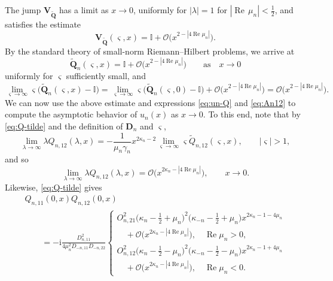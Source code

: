 \documentclass[pdftex]{sigma}
\numberwithin{equation}{section}
\newcommand{\ii}{\mathrm{i}}
\newcommand{\re}{\operatorname{Re}}
\begin{document}
The jump $\mathbf{V}_{\widetilde{\mathbf{Q}}}$ has a limit as $x\to 0$, uniformly for $|\lambda|=1$ for $|{\re}\,  \mu_n| <\frac{1}{2}$, and satisfies the estimate
\begin{equation*}
 \mathbf{V}_{\widetilde{\mathbf{Q}}}(\varsigma,x)=\mathbb{I}+\mathcal{O} \big(x^{2-|4\re\mu_n|} \big).
\end{equation*}
By the standard theory of small-norm Riemann--Hilbert problems, we arrive at
\begin{equation*}
 \widetilde{\mathbf{Q}}_n(\varsigma,x)=\mathbb{I} + \mathcal{O} \big(x^{2-|4\re\mu_n|} \big) \qquad \text{as} \quad x\to 0
\end{equation*}
uniformly for $\varsigma$ sufficiently small, and
\begin{equation*}
 \lim_{\varsigma\to\infty}\varsigma\big(\widetilde{\mathbf{Q}}_n(\varsigma,x)-\mathbb{I}\big)=\lim_{\varsigma\to\infty}\varsigma\big(\widetilde{\mathbf{Q}}_n(\varsigma,0)-\mathbb{I}\big)+\mathcal{O}\big(x^{2-|4\re\mu_n|} \big)=\mathcal{O}\big(x^{2-|4\re\mu_n|} \big).
\end{equation*}
We can now use the above estimate and expressions \eqref{eq:un-Q} and \eqref{eq:An12} to compute the asymptotic behavior of $u_n(x)$ as $x\to 0$. To this end, note that by \eqref{eq:Q-tilde} and the definition of $\mathbf{D}_n$ and $\varsigma$,
\begin{equation*}
 \lim_{\lambda\to\infty}\lambda Q_{n,12}(\lambda,x)=-\frac{1}{\mu_n\gamma_n} x^{2\kappa_n-2} \lim_{\varsigma\to\infty}\varsigma \widetilde{Q}_{n,12}(\varsigma,x),\qquad |\varsigma|>1,
\end{equation*}
and so
\begin{equation}
 \lim_{\lambda\to\infty}\lambda Q_{n,12}(\lambda,x)=\mathcal{O} \big(x^{2\kappa_n-|4\re\mu_n|} \big),\qquad x\to 0.
 \label{eq:Q-at-infty}
\end{equation}
Likewise, \eqref{eq:Q-tilde} gives
\begin{gather}
 Q_{n,11}(0,x)Q_{n,12}(0,x)\nonumber\\
 \qquad=-\ii\frac{D_{n,11}^2}{4\mu_n^2D_{-n,11}D_{-n,22}}
 \begin{cases} {O_{n,21}^2\big(\kappa_n-\tfrac{1}{2}+\mu_n\big)^2\big(\kappa_{-n}-\tfrac{1}{2}+\mu_n\big)}{}x^{2\kappa_n-1-4\mu_n}\\
 \quad{}+ \mathcal{O}\big(x^{2\kappa_n-|4\re\mu_n|}\big),\quad \re \mu_n>0,
 \\{O_{n,12
 }^2\big(\kappa_n-\tfrac{1}{2}-\mu_n\big)^2\big(\kappa_{-n}-\tfrac{1}{2}-\mu_n\big)}{}x^{2\kappa_n-1+4\mu_n}\\
 \quad{}+ \mathcal{O}\big(x^{2\kappa_n-|4\re\mu_n|}\big),\quad \re \mu_n<0.
 \end{cases}
 \label{eq:Q-at-zero}
\end{gather}
\end{document}
